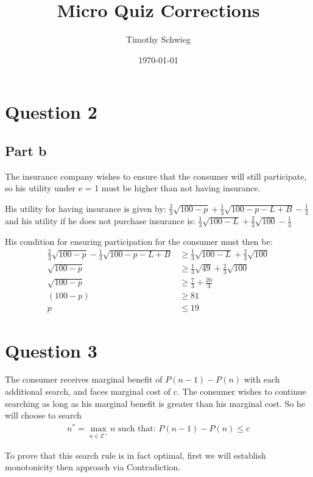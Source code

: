\documentclass[11pt]{article}
\author{Timothy Schwieg}
\date{\today}
\title{Micro Quiz Corrections}
\begin{document}
\maketitle

\section{Question 2}
\label{sec-1}
\subsection{Part b}
\label{sec-1-1}
The insurance company wishes to ensure that the consumer will still
participate, so his utility under e = 1 must be higher than not having
insurance.

His utility for having insurance is given by: $\frac{2}{3} \sqrt{
100 - p } + \frac{1}{3} \sqrt{ 100 - p - L + B } - \frac{1}{3}$ and his
utility if he does not purchase insurance is: $\frac{1}{3} \sqrt{
100 - L } + \frac{2}{3} \sqrt{ 100 } - \frac{1}{3}$

His condition for ensuring participation for the consumer must then
be:
\begin{align*}
\frac{2}{3} \sqrt{ 100 - p } - \frac{1}{3}\sqrt{ 100 - p - L + B }
&\geq \frac{1}{3} \sqrt{ 100 - L } + 
\frac{2}{3} \sqrt{ 100 } \\
\sqrt{ 100 - p } &\geq \frac{1}{3} \sqrt{49} + \frac{2}{3} \sqrt{ 100
}\\
\sqrt{ 100 - p } &\geq \frac{7}{3} + \frac{ 20}{3} \\
( 100 - p ) &\geq 81\\
p &\leq 19
\end{align*}

\section{Question 3}
\label{sec-2}
The consumer receives marginal benefit of $P(n-1) - P(n)$ with each
additional search, and faces marginal cost of c. The consumer wishes
to continue searching as long as his marginal benefit is greater than
his marginal cost. So he will choose to search 
\begin{align*}
n^* = \max_{n \in
\mathbb{Z}^+} n \text{ such that: } P(n-1) - P(n) \leq c
\end{align*}

To prove that this search rule is in fact optimal, first we will
establish monotonicity then approach via Contradiction. 
\end{document}
